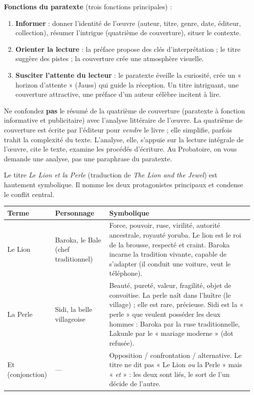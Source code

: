 \documentclass[11pt]{article}
\newcommand{\cle}[1]{{\popxbold\color{popdark}#1}}
\newcounter{popsec}
\newcounter{popsub}
\newcommand{\courssub}[1]{%
  \stepcounter{popsub}%
  \par\vspace{9pt}\noindent{\popxbold\fontsize{11.5}{13}\selectfont\color{popink}{\color{poporange}\thepopsec.\thepopsub}\hspace{6pt}#1}\par\nopagebreak\vspace{4pt}
}
\begin{document}
\textbf{Fonctions du paratexte} (trois fonctions principales) :
\begin{enumerate}
\item \textbf{Informer} : donner l'identité de l'œuvre (auteur, titre, genre, date, éditeur, collection), résumer l'intrigue (quatrième de couverture), situer le contexte.
\item \textbf{Orienter la lecture} : la préface propose des clés d'interprétation ; le titre suggère des pistes ; la couverture crée une atmosphère visuelle.
\item \textbf{Susciter l'attente du lecteur} : le paratexte éveille la curiosité, crée un « horizon d'attente » (Jauss) qui guide la réception. Un titre intriguant, une couverture attractive, une préface d'un auteur célèbre incitent à lire.
\end{enumerate}

\begin{attention}
Ne confondez \textbf{pas} le résumé de la quatrième de couverture (paratexte à fonction informative et publicitaire) avec l'analyse littéraire de l'œuvre. La quatrième de couverture est écrite par l'éditeur pour \emph{vendre} le livre ; elle simplifie, parfois trahit la complexité du texte. L'analyse, elle, s'appuie sur la lecture intégrale de l'œuvre, cite le texte, examine les procédés d'écriture. Au Probatoire, on vous demande une analyse, pas une paraphrase du paratexte.
\end{attention}

\courssub{Analyse du titre : \emph{Le Lion et la Perle}}

Le titre \emph{Le Lion et la Perle} (traduction de \emph{The Lion and the Jewel}) est hautement symbolique. Il nomme les deux protagonistes principaux et condense le conflit central.

\begin{center}
\begin{tabularx}{\linewidth}{|l|X|X|}\hline
\textbf{Terme} & \textbf{Personnage} & \textbf{Symbolique} \\ \hline
\cle{Le Lion} & Baroka, le Bale (chef traditionnel) & Force, pouvoir, ruse, virilité, autorité ancestrale, royauté yoruba. Le lion est le roi de la brousse, respecté et craint. Baroka incarne la tradition vivante, capable de s'adapter (il conduit une voiture, veut le téléphone). \\ \hline
\cle{La Perle} & Sidi, la belle villageoise & Beauté, pureté, valeur, fragilité, objet de convoitise. La perle naît dans l'huître (le village) ; elle est rare, précieuse. Sidi est la « perle » que veulent posséder les deux hommes : Baroka par la ruse traditionnelle, Lakunle par le « mariage moderne » (dot refusée). \\ \hline
\cle{Et} (conjonction) & — & Opposition / confrontation / alternative. Le titre ne dit pas « Le Lion \emph{ou} la Perle » mais « \emph{et} » : les deux sont liés, le sort de l'un décide de l'autre. \\ \hline
\end{tabularx}
\end{center}
\end{document}
